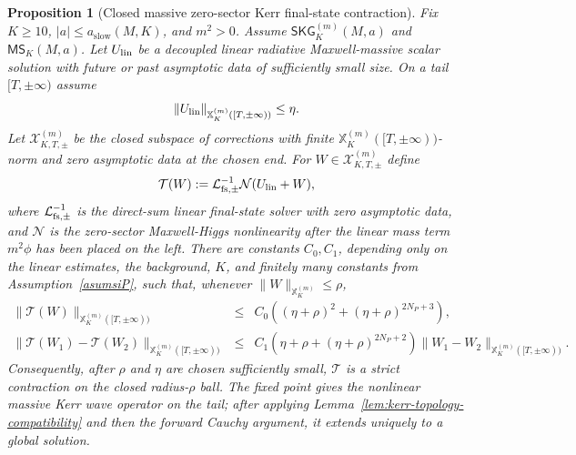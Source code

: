 \documentclass[11pt]{article}
\numberwithin{equation}{section}
\theoremstyle{plain}
\newtheorem{proposition}[theorem]{Proposition}
\theoremstyle{definition}
\theoremstyle{remark}
\newcommand{\SKG}{\mathsf{SKG}}
\newcommand{\MScat}{\mathsf{MS}}
\begin{document}
\begin{proposition}[Closed massive zero-sector Kerr final-state contraction]\label{prop:kerr-massive-finalstate-contraction}
Fix \(K\ge10\), \(|a|\le a_{\mathrm{slow}}(M,K)\), and \(m^2>0\).  Assume \(\SKG^{(m)}_K(M,a)\) and \(\MScat_K(M,a)\).  Let \(U_{\rm lin}\) be a decoupled linear radiative Maxwell-massive scalar solution with future or past asymptotic data of sufficiently small size.  On a tail \([T,\pm\infty)\) assume
\begin{equation}\label{eq:kerr-massive-tail-lin-small}
 \|U_{\rm lin}\|_{\mathbb X_K^{(m)}([T,\pm\infty))}\le \eta.
\end{equation}
Let \(\mathcal X^{(m)}_{K,T,\pm}\) be the closed subspace of corrections with finite \(\mathbb X_K^{(m)}([T,\pm\infty))\)-norm and zero asymptotic data at the chosen end.  For \(W\in\mathcal X^{(m)}_{K,T,\pm}\) define
\begin{equation}\label{eq:kerr-massive-tail-map}
 \mathcal T(W):=\mathcal L^{-1}_{{\rm fs},\pm}\mathcal N(U_{\rm lin}+W),
\end{equation}
where \(\mathcal L^{-1}_{{\rm fs},\pm}\) is the direct-sum linear final-state solver with zero asymptotic data, and \(\mathcal N\) is the zero-sector Maxwell-Higgs nonlinearity after the linear mass term \(m^2\phi\) has been placed on the left.  There are constants \(C_0,C_1\), depending only on the linear estimates, the background, \(K\), and finitely many constants from Assumption~\ref{asumsiP}, such that, whenever \(\|W\|_{\mathbb X_K^{(m)}}\le \rho\),
\begin{eqnarray}
 \|\mathcal T(W)\|_{\mathbb X_K^{(m)}([T,\pm\infty))}
 &\le& C_0\left((\eta+\rho)^2+(\eta+\rho)^{2N_P+3}\right),\label{eq:kerr-massive-finalstate-size}\\
 \|\mathcal T(W_1)-\mathcal T(W_2)\|_{\mathbb X_K^{(m)}([T,\pm\infty))}
 &\le& C_1\left(\eta+\rho+(\eta+\rho)^{2N_P+2}\right)
 \|W_1-W_2\|_{\mathbb X_K^{(m)}([T,\pm\infty))}.\label{eq:kerr-massive-finalstate-lip}
\end{eqnarray}
Consequently, after \(\rho\) and \(\eta\) are chosen sufficiently small, \(\mathcal T\) is a strict contraction on the closed radius-\(\rho\) ball.  The fixed point gives the nonlinear massive Kerr wave operator on the tail; after applying Lemma~\ref{lem:kerr-topology-compatibility} and then the forward Cauchy argument, it extends uniquely to a global solution.
\end{proposition}
\end{document}
